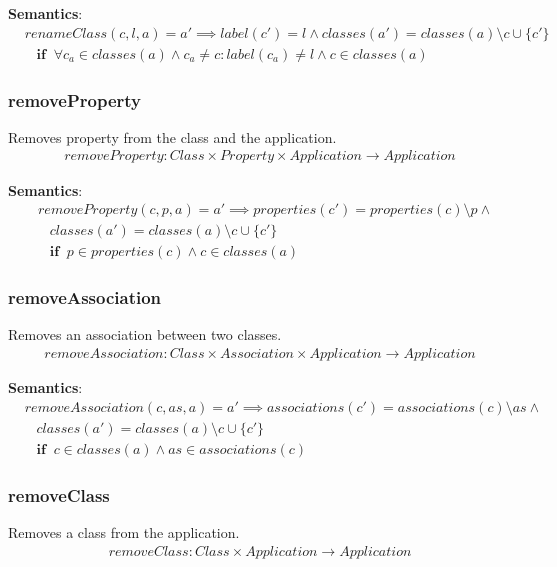 \documentclass[10pt]{article}
\begin{document}
\noindent \textbf{Semantics}:
\begin{align}
& renameClass(c, l, a) = a' \implies label(c') = l \land classes(a') = classes(a) \setminus c  \cup \{c'\} \nonumber \\
& \;\;\; \mathbf{if} \;\; \forall c_a \in classes(a) \land c_a \neq c: label(c_a) \neq l  \land c \in classes(a)
\end{align}

\subsubsection{removeProperty}
Removes property from the class and the application.
\begin{align}
removeProperty: Class \times Property \times Application \rightarrow Application
\end{align}

\noindent \textbf{Semantics}:
\begin{align}
& removeProperty(c, p, a) = a' \implies properties(c') = properties(c) \setminus p   \land \nonumber \\
& \;\;\; classes(a') = classes(a) \setminus c  \cup \{c'\}  \nonumber \\
& \;\;\; \mathbf{if} \;\; p \in properties(c) \land c \in classes(a)
\end{align}

\subsubsection{removeAssociation}
Removes an association between two classes.
\begin{align}
removeAssociation: Class \times Association \times Application \rightarrow Application
\end{align}

\noindent \textbf{Semantics}:
\begin{align}
& removeAssociation(c, as, a) = a' \implies associations(c') = associations(c) \setminus as \land \nonumber \\
& \;\;\; classes(a') = classes(a) \setminus c  \cup \{c'\} \nonumber \\
& \;\;\; \mathbf{if} \;\; c \in classes(a) \land as \in associations(c)
\end{align}

\subsubsection{removeClass}
Removes a class from the application.
\begin{align}
removeClass: Class \times Application \rightarrow Application
\end{align}
\end{document}
